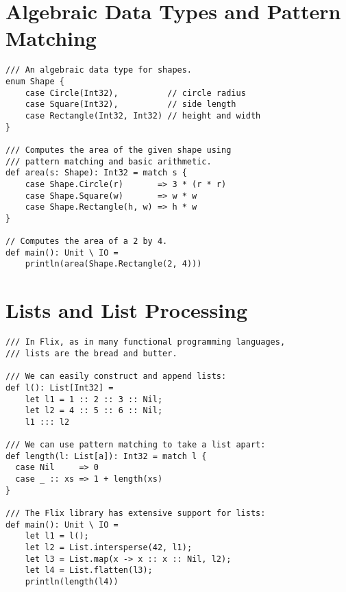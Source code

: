 \documentclass{article}
\begin{document}
\section{Algebraic Data Types and Pattern Matching}

\begin{lstlisting}
/// An algebraic data type for shapes.
enum Shape {
    case Circle(Int32),          // circle radius
    case Square(Int32),          // side length
    case Rectangle(Int32, Int32) // height and width
}

/// Computes the area of the given shape using
/// pattern matching and basic arithmetic.
def area(s: Shape): Int32 = match s {
    case Shape.Circle(r)       => 3 * (r * r)
    case Shape.Square(w)       => w * w
    case Shape.Rectangle(h, w) => h * w
}

// Computes the area of a 2 by 4.
def main(): Unit \ IO =
    println(area(Shape.Rectangle(2, 4)))
\end{lstlisting}

\section{Lists and List Processing}

\begin{lstlisting}
/// In Flix, as in many functional programming languages, 
/// lists are the bread and butter.

/// We can easily construct and append lists:
def l(): List[Int32] =
    let l1 = 1 :: 2 :: 3 :: Nil;
    let l2 = 4 :: 5 :: 6 :: Nil;
    l1 ::: l2

/// We can use pattern matching to take a list apart:
def length(l: List[a]): Int32 = match l {
  case Nil     => 0
  case _ :: xs => 1 + length(xs)
}

/// The Flix library has extensive support for lists:
def main(): Unit \ IO =
    let l1 = l();
    let l2 = List.intersperse(42, l1);
    let l3 = List.map(x -> x :: x :: Nil, l2);
    let l4 = List.flatten(l3);
    println(length(l4))
\end{lstlisting}
\end{document}

